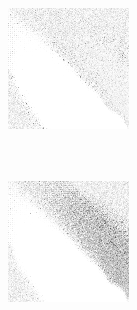 \begin{figure}
\begin{subfigure}[t]{0.22\textwidth}
		\caption{\handmaxavg}
	\end{subfigure}
	~
	\begin{subfigure}[t]{0.22\textwidth}
		\includegraphics[width=\textwidth]{images/findings/experiments/punishment/strategies_handmaxmed.png}
		\caption{\handmaxmed}
	\end{subfigure}
	~
	\begin{subfigure}[t]{0.22\textwidth}
		\includegraphics[width=\textwidth]{images/findings/experiments/punishment/strategies_handmaxposs.png}
		\caption{\handmaxposs}
	\end{subfigure}


\end{figure}
